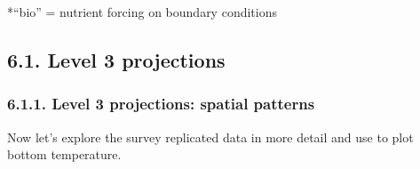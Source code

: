 \documentclass[
]{article}
\begin{document}
*``bio'' = nutrient forcing on boundary conditions

\hypertarget{level-3-projections}{%
\subsection{6.1. Level 3 projections}\label{level-3-projections}}

\hypertarget{level-3-projections-spatial-patterns}{%
\subsubsection{6.1.1. Level 3 projections: spatial
patterns}\label{level-3-projections-spatial-patterns}}

Now let's explore the survey replicated data in more detail and use to
plot bottom temperature.
\end{document}
